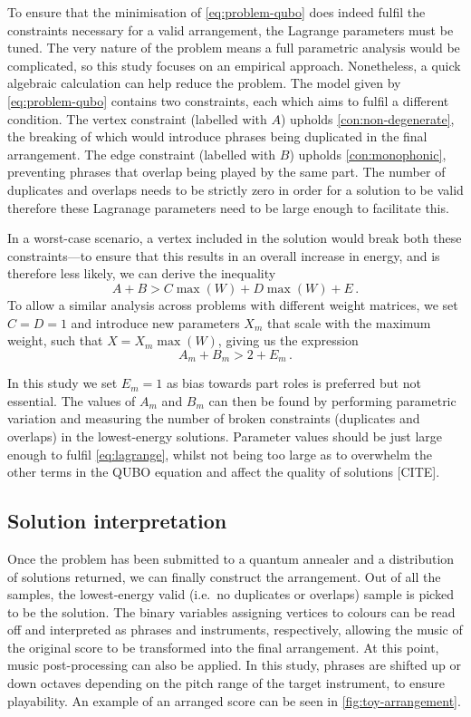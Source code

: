 \documentclass[12pt]{article}
\theoremstyle{definition}
\begin{document}
To ensure that the minimisation of \cref{eq:problem-qubo} does indeed fulfil the constraints necessary for a valid arrangement, the Lagrange parameters must be tuned. The very nature of the problem means a full parametric analysis would be complicated, so this study focuses on an empirical approach.
Nonetheless, a quick algebraic calculation can help reduce the problem. The model given by \cref{eq:problem-qubo} contains two constraints, each which aims to fulfil a different condition. The vertex constraint (labelled with $A$) upholds \cref{con:non-degenerate}, the breaking of which would introduce phrases being duplicated in the final arrangement. The edge constraint (labelled with $B$) upholds \cref{con:monophonic}, preventing phrases that overlap being played by the same part. The number of duplicates and overlaps needs to be strictly zero in order for a solution to be valid therefore these Lagranage parameters need to be large enough to facilitate this.

In a worst-case scenario, a vertex included in the solution would break both these constraints---to ensure that this results in an overall increase in energy, and is therefore less likely, we can derive the inequality
\begin{equation}
    A + B > C\max(W) + D\max(W) + E \,.
\end{equation}
To allow a similar analysis across problems with different weight matrices, we set $C=D=1$ and introduce new parameters $X_m$ that scale with the maximum weight, such that $X = X_m\max(W)$, giving us the expression
\begin{equation}
    A_m + B_m > 2 + E_m \,.
    \label{eq:lagrange}
\end{equation}

In this study we set $E_m=1$ as bias towards part roles is preferred but not essential. The values of $A_m$ and $B_m$ can then be found by performing parametric variation and measuring the number of broken constraints (duplicates and overlaps) in the lowest-energy solutions. Parameter values should be just large enough to fulfil \cref{eq:lagrange}, whilst not being too large as to overwhelm the other terms in the QUBO equation and affect the quality of solutions [CITE].

\subsection{Solution interpretation}

Once the problem has been submitted to a quantum annealer and a distribution of solutions returned, we can finally construct the arrangement. Out of all the samples, the lowest-energy valid (i.e.\ no duplicates or overlaps) sample is picked to be the solution. The binary variables assigning vertices to colours can be read off and interpreted as phrases and instruments, respectively, allowing the music of the original score to be transformed into the final arrangement.
At this point, music post-processing can also be applied. In this study, phrases are shifted up or down octaves depending on the pitch range of the target instrument, to ensure playability. An example of an arranged score can be seen in \cref{fig:toy-arrangement}.
\end{document}
